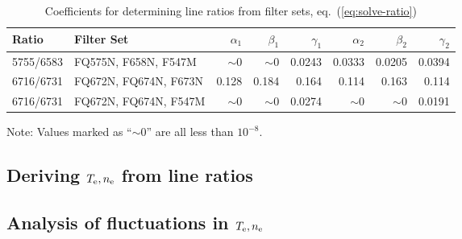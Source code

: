 \documentclass[preprint]{aastex}
\begin{document}
\begin{table}
  \caption{Coefficients for determining line ratios from filter sets,
    eq.~(\ref{eq:solve-ratio})}
  \label{tab:coefficients}
  \medskip
  \begin{tabular}{llrrrrrr}\toprule
    Ratio & Filter Set & 
    \(\alpha_1\) &
    \(\beta_1 \) &
    \(\gamma_1\) & 
    \(\alpha_2\) & 
    \(\beta_2 \) & 
    \(\gamma_2\) \\
    \midrule
    \nii{} 5755/6583 & FQ575N, F658N, F547M & 
    \(\sim 0\) & \(\sim 0\) & 0.0243 & 0.0333 & 0.0205 & 0.0394 \\
    \sii{} 6716/6731 & FQ672N, FQ674N, F673N &
    0.128 & 0.184 & 0.164 & 0.114 & 0.163 & 0.114 \\
    \sii{} 6716/6731 & FQ672N, FQ674N, F547M &
    \(\sim 0\) & \(\sim 0\) & 0.0274 & \(\sim 0\) & \(\sim 0\) & 0.0191 \\ \bottomrule
  \end{tabular}
  Note: Values marked as ``\(\sim 0\)'' are all less than \(10^{-8}\). 
\end{table}


\subsection{\boldmath Deriving \(T_{\mathrm{e}}, n_{\mathrm{e}}\) from line ratios}
\label{sec:derive}



\subsection{\boldmath Analysis of fluctuations in \(T_{\mathrm{e}}, n_{\mathrm{e}}\)}
\label{sec:fluct}


\end{document}
